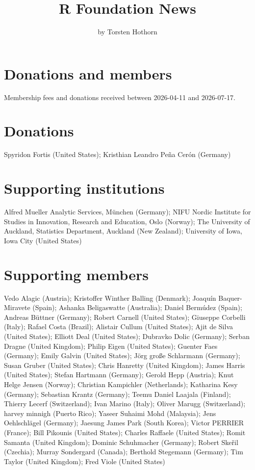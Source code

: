 \title{R Foundation News}


\author{by Torsten Hothorn}

\maketitle


\section{Donations and members}\label{donations-and-members}

Membership fees and donations received between
2026-04-11 and 2026-07-17.

\section{Donations}\label{donations}

Spyridon Fortis (United States);
Kristhian Leandro Peña Cerón (Germany)

\section{Supporting institutions}\label{supporting-institutions}

Alfred Mueller Analytic Services, München (Germany);
NIFU Nordic Institute for Studies in Innovation, Research and Education, Oslo (Norway);
The University of Auckland, Statistics Department, Auckland (New Zealand);
University of Iowa, Iowa City (United States)

\section{Supporting members}\label{supporting-members}

Vedo Alagic (Austria);
Kristoffer Winther Balling (Denmark);
Joaquín Baquer-Miravete (Spain);
Ashanka Beligaswatte (Australia);
Daniel Bermúdez (Spain);
Andreas Büttner (Germany);
Robert Carnell (United States);
Giuseppe Corbelli (Italy);
Rafael Costa (Brazil);
Alistair Cullum (United States);
Ajit de Silva (United States);
Elliott Deal (United States);
Dubravko Dolic (Germany);
Serban Dragne (United Kingdom);
Philip Eigen (United States);
Guenter Faes (Germany);
Emily Galvin (United States);
Jörg große Schlarmann (Germany);
Susan Gruber (United States);
Chris Hanretty (United Kingdom);
James Harris (United States);
Stefan Hartmann (Germany);
Gerold Hepp (Austria);
Knut Helge Jensen (Norway);
Christian Kampichler (Netherlands);
Katharina Kesy (Germany);
Sebastian Krantz (Germany);
Teemu Daniel Laajala (Finland);
Thierry Lecerf (Switzerland);
Ivan Marino (Italy);
Oliver Marugg (Switzerland);
harvey minnigh (Puerto Rico);
Yaseer Suhaimi Mohd (Malaysia);
Jens Oehlschlägel (Germany);
Jaesung James Park (South Korea);
Victor PERRIER (France);
Bill Pikounis (United States);
Charles Raffaele (United States);
Romit Samanta (United Kingdom);
Dominic Schuhmacher (Germany);
Robert Skeřil (Czechia);
Murray Sondergard (Canada);
Berthold Stegemann (Germany);
Tim Taylor (United Kingdom);
Fred Viole (United States)


\address{%
Torsten Hothorn\\
Universität Zürich\\%
Switzerland\\
%
%
\textit{ORCiD: \href{https://orcid.org/0000-0001-8301-0471}{0000-0001-8301-0471}}\\%
\href{mailto:Torsten.Hothorn@R-project.org}{\nolinkurl{Torsten.Hothorn@R-project.org}}%
}
